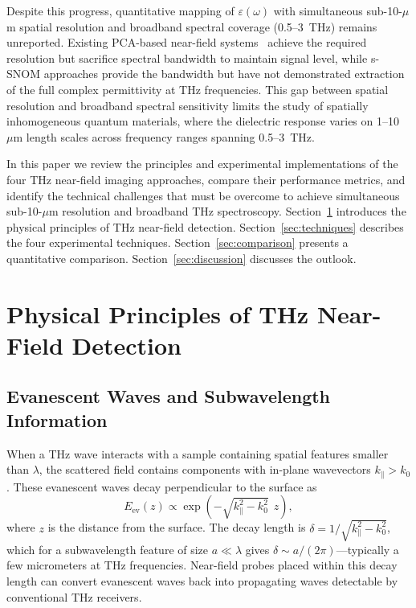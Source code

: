 \documentclass[reprint,superscriptaddress,amsmath,amssymb]{revtex4-2}
\begin{document}
Despite this progress, quantitative mapping of $\varepsilon(\omega)$ with simultaneous sub-10-$\mu$m spatial resolution and broadband spectral coverage (0.5--3~THz) remains unreported. Existing PCA-based near-field systems~\cite{Bitzer2010,Nagel2012} achieve the required resolution but sacrifice spectral bandwidth to maintain signal level, while s-SNOM approaches provide the bandwidth but have not demonstrated extraction of the full complex permittivity at THz frequencies. This gap between spatial resolution and broadband spectral sensitivity limits the study of spatially inhomogeneous quantum materials, where the dielectric response varies on 1--10~$\mu$m length scales across frequency ranges spanning 0.5--3~THz.

In this paper we review the principles and experimental implementations of the four THz near-field imaging approaches, compare their performance metrics, and identify the technical challenges that must be overcome to achieve simultaneous sub-10-$\mu$m resolution and broadband THz spectroscopy. Section~\ref{sec:principles} introduces the physical principles of THz near-field detection. Section~\ref{sec:techniques} describes the four experimental techniques. Section~\ref{sec:comparison} presents a quantitative comparison. Section~\ref{sec:discussion} discusses the outlook.

\section{Physical Principles of THz Near-Field Detection}
\label{sec:principles}

\subsection{Evanescent Waves and Subwavelength Information}

When a THz wave interacts with a sample containing spatial features smaller than $\lambda$, the scattered field contains components with in-plane wavevectors $k_{\parallel} > k_0$. These evanescent waves decay perpendicular to the surface as
\begin{equation}
E_{\mathrm{ev}}(z) \propto \exp\!\left(-\sqrt{k_{\parallel}^2 - k_0^2}\;\, z\right),
\end{equation}
where $z$ is the distance from the surface. The decay length is $\delta = 1/\sqrt{k_{\parallel}^2 - k_0^2}$, which for a subwavelength feature of size $a \ll \lambda$ gives $\delta \sim a/(2\pi)$---typically a few micrometers at THz frequencies. Near-field probes placed within this decay length can convert evanescent waves back into propagating waves detectable by conventional THz receivers.
\end{document}
